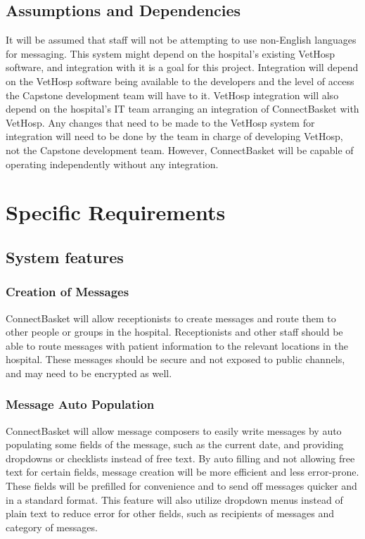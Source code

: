 \documentclass[onecolumn, draftclsnofoot,10pt, compsoc]{IEEEtran}
\begin{document}
\subsection{Assumptions and Dependencies}
It will be assumed that staff will not be attempting to use non-English languages for messaging. This system might depend on the hospital's existing VetHosp software, and integration with it is a goal for this project. Integration will depend on the VetHosp software being available to the developers and the level of access the Capstone development team will have to it. VetHosp integration will also depend on the hospital's IT team arranging an integration of ConnectBasket with VetHosp. Any changes that need to be made to the VetHosp system for integration will need to be done by the team in charge of developing VetHosp, not the Capstone development team. However, ConnectBasket will be capable of operating independently without any integration.

\section{Specific Requirements}

\subsection{System features}

\subsubsection{Creation of Messages}
ConnectBasket will allow receptionists to create messages and route them to other people or groups in the hospital. Receptionists and other staff should be able to route messages with patient information to the relevant locations in the hospital. These messages should be secure and not exposed to public channels, and may need to be encrypted as well.

\subsubsection{Message Auto Population}
ConnectBasket will allow message composers to easily write messages by auto populating some fields of the message, such as the current date, and providing dropdowns or checklists instead of free text. By auto filling and not allowing free text for certain fields, message creation will be more efficient and less error-prone. These fields will be prefilled for convenience and to send off messages quicker and in a standard format. This feature will also utilize dropdown menus instead of plain text to reduce error for other fields, such as recipients of messages and category of messages.
\end{document}
